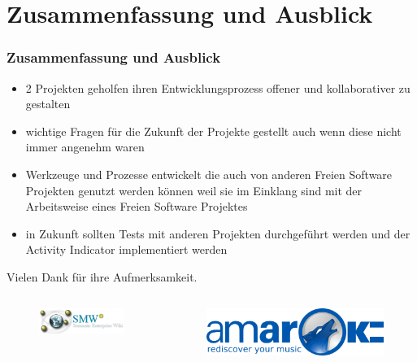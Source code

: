 \documentclass{beamer}
\begin{document}
\section{Zusammenfassung und Ausblick}

\begin{frame}
\frametitle{Zusammenfassung und Ausblick}
\begin{itemize}
 \item 2 Projekten geholfen ihren Entwicklungsprozess offener und kollaborativer zu gestalten
 \item wichtige Fragen f\"ur die Zukunft der Projekte gestellt auch wenn diese nicht immer angenehm waren
 \item Werkzeuge und Prozesse entwickelt die auch von anderen Freien Software Projekten genutzt werden k\"onnen weil sie im Einklang sind mit der Arbeitsweise eines Freien Software Projektes
 \item in Zukunft sollten Tests mit anderen Projekten durchgeführt werden und der Activity Indicator implementiert werden
\end{itemize}
\end{frame}

\begin{frame}
\begin{center}
 Vielen Dank f\"ur ihre Aufmerksamkeit.
\end{center}

\begin{columns}
   \begin{figure}[h!]
    \centering
    \includegraphics[scale=0.5,keepaspectratio=true]{./smwpluslogo.png}
   \end{figure}
   \begin{figure}[h!]
    \centering
    \includegraphics[scale=0.3,keepaspectratio=true]{./amaroklogo.png}
   \end{figure}
\end{columns}
\end{frame}
\end{document}
